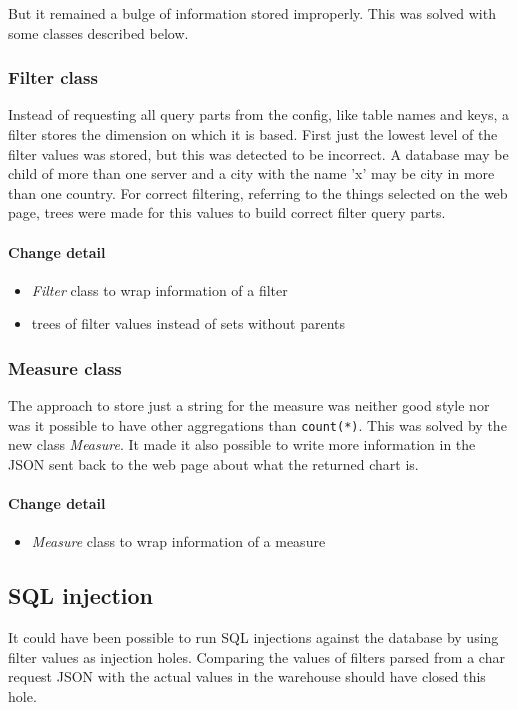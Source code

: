 But it remained a bulge of information stored improperly. This was
solved with some classes described below.

\subsubsection{Filter class} 
Instead of requesting all query parts from the config, like table names and keys,
a filter stores the dimension on which it is based. First just the lowest
level of the filter values was stored, but this was detected to be incorrect.
A database may be child of more than one server and a city with the name 'x'
may be city in more than one country. For correct filtering, referring
to the things selected on the web page, trees were made for this values 
to build correct filter query parts.

\paragraph{Change detail}
\begin{itemize}
  \item \textit{Filter} class to wrap information of a filter
  \item trees of filter values instead of sets without parents
\end{itemize}


\subsubsection{Measure class}
The approach to store just a string for the measure was neither good style
nor was it possible to have other aggregations than \texttt{count(*)}.
This was solved by the new class \textit{Measure}. It made it also possible
to write more information in the JSON sent back to the web page about what
the returned chart is.

\paragraph{Change detail}
\begin{itemize}
  \item \textit{Measure} class to wrap information of a measure
\end{itemize}

\subsection{SQL injection}\label{inj}
It could have been possible to run SQL injections against the database
by using filter values as injection holes. Comparing the values of filters
parsed from a char request JSON with the actual values in the warehouse
should have closed this hole.

